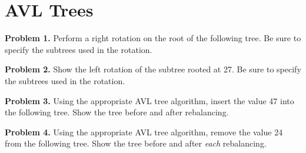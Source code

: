 \documentclass{article}
\begin{document}
\section{AVL Trees}

\noindent \textbf{Problem 1.} Perform a right rotation on the root of the following tree.  Be sure to specify the subtrees used in the rotation.


\noindent \textbf{Problem 2.} Show the left rotation of the subtree rooted at 27.  Be sure to specify the subtrees used in the rotation.



\noindent \textbf{Problem 3.} Using the appropriate AVL tree algorithm, insert the value 47 into the following tree.  Show the tree before and after rebalancing.



\noindent \textbf{Problem 4.} Using the appropriate AVL tree algorithm, remove the value 24 from the following tree.  Show the tree before and after \textit{each} rebalancing.


\end{document}
